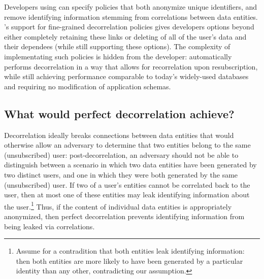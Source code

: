 Developers using \sys{} can specify policies that both anonymize unique identifiers, and remove
identifying information stemming from correlations between data entities. \sys{}'s support for
fine-grained decorrelation policies gives developers options beyond either completely retaining
these links or deleting of all of the user's data and their dependees (while still supporting
these options). The complexity of implementating such policies is hidden from the developer:
\sys{} automatically performs decorrelation in a way that allows for recorrelation upon
resubscription, while still achieving performance comparable to today’s widely-used databases and
requiring no modification of application schemas. 

\subsection{What would perfect decorrelation achieve?}
Decorrelation ideally breaks connections between data entities that would otherwise allow
an adversary to determine that two entities belong to the same (unsubscribed) user:
post-decorrelation, an adversary should not be able to distinguish between a scenario in which two data entities
have been generated by two distinct users, and one in which they were both generated by the same
(unsubscribed) user.  If two of a user's entities cannot be correlated back to the user, then at
most one of these entities may leak identifying information about the user.\footnote{Assume for a
contradition that both entities leak identifying information: then both entities are more likely to
have been generated by a particular identity than any other, contradicting our assumption.}  Thus,
if the content of individual data entities is appropriately anonymized, then perfect decorrelation prevents
identifying information from being leaked via correlations.

